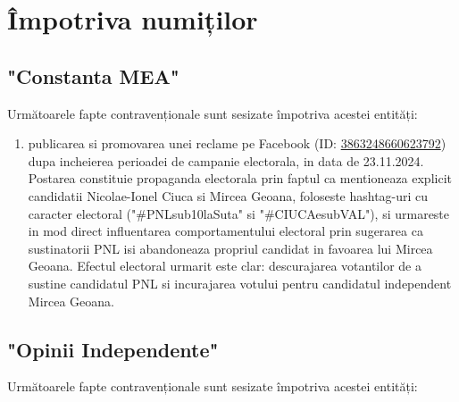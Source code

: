 \documentclass[a4paper,12pt]{article}
\begin{document}
\tableofcontents
\newpage

\section{Împotriva numiților}

\subsection{"Constanta MEA"}
Următoarele fapte contravenționale sunt sesizate împotriva acestei entități:

\begin{enumerate}[leftmargin=*, label=\arabic*.)]
    \item publicarea si promovarea unei reclame pe Facebook (ID: \href{https://www.facebook.com/ads/library/?id=3863248660623792}{3863248660623792}) dupa incheierea perioadei de campanie electorala, in data de 23.11.2024. Postarea constituie propaganda electorala prin faptul ca mentioneaza explicit candidatii Nicolae-Ionel Ciuca si Mircea Geoana, foloseste hashtag-uri cu caracter electoral ("\#PNLsub10laSuta" si "\#CIUCAesubVAL"), si urmareste in mod direct influentarea comportamentului electoral prin sugerarea ca sustinatorii PNL isi abandoneaza propriul candidat in favoarea lui Mircea Geoana. Efectul electoral urmarit este clar: descurajarea votantilor de a sustine candidatul PNL si incurajarea votului pentru candidatul independent Mircea Geoana.
\end{enumerate}

\vspace{0.5cm}

\subsection{"Opinii Independente"}
Următoarele fapte contravenționale sunt sesizate împotriva acestei entități:
\end{document}
